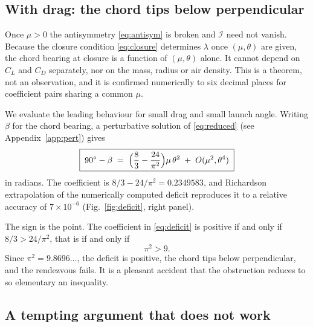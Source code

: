 \documentclass[aip,amsmath,amssymb,preprint,floatfix]{revtex4-2}
\begin{document}
\subsection{With drag: the chord tips below perpendicular}

Once $\mu>0$ the antisymmetry \eqref{eq:antisym} is broken and $\mathcal{I}$ need not
vanish. Because the closure condition \eqref{eq:closure} determines $\lambda$ once
$(\mu,\theta)$ are given, the chord bearing at closure is a function of $(\mu,\theta)$
alone. It cannot depend on $C_L$ and $C_D$ separately, nor on the mass, radius or air
density. This is a theorem, not an observation, and it is confirmed numerically to six
decimal places for coefficient pairs sharing a common $\mu$.

We evaluate the leading behaviour for small drag and small launch angle. Writing
$\beta$ for the chord bearing, a perturbative solution of \eqref{eq:reduced} (see
Appendix~\ref{app:pert}) gives
\begin{equation}
\boxed{\;90^\circ-\beta \;=\; \Bigl(\frac{8}{3}-\frac{24}{\pi^{2}}\Bigr)\mu\,\theta^{2}
 \;+\; O(\mu^{2},\theta^{4})\;}
\label{eq:deficit}
\end{equation}
in radians. The coefficient is
$8/3-24/\pi^2=0.2349583$, and Richardson extrapolation of the numerically computed
deficit reproduces it to a relative accuracy of $7\times10^{-6}$
(Fig.~\ref{fig:deficit}, right panel).

The sign is the point. The coefficient in \eqref{eq:deficit} is positive if and only
if $8/3>24/\pi^2$, that is if and only if
\begin{equation}
\pi^2 > 9 .
\end{equation}
Since $\pi^2=9.8696\ldots$, the deficit is positive, the chord tips below
perpendicular, and the rendezvous fails. It is a pleasant accident that the
obstruction reduces to so elementary an inequality.

\subsection{A tempting argument that does not work}
\end{document}
